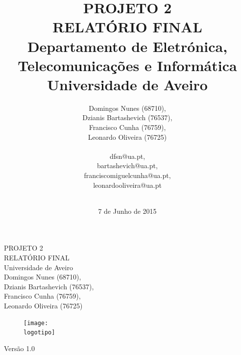 \documentclass{report}
\begin{document}
%
\def\titulo{PROJETO 2\\RELATÓRIO FINAL}
\def\data{7 de Junho de 2015}
\def\autores{Domingos Nunes (68710),\\ Dzianis Bartashevich (76537),\\ Francisco Cunha (76759),\\ Leonardo Oliveira (76725)}
\def\autorescontactos{dfsn@ua.pt,\\ bartashevich@ua.pt,\\ franciscomiguelcunha@ua.pt,\\ leonardooliveira@ua.pt}
\def\versao{Versão 1.0}
\def\departamento{Departamento de Eletrónica,\\ Telecomunicações e Informática}
\def\empresa{Universidade de Aveiro}
\def\logotipo{images/ua.pdf}
%
%
\begin{titlepage}

\begin{center}
%
\vspace*{50mm}
%
{\Huge \titulo}\\ 
%
\vspace{10mm}
%
{\Large \empresa}\\
%
\vspace{10mm}
%
{\LARGE \autores}\\ 
%
%
\vspace{20mm}
%
\begin{figure}[h]
\center
\texttt{[image: \\logotipo]}
\end{figure}
%
\vspace{10mm}
\end{center}
%
\begin{flushright}
\versao
\end{flushright}
\end{titlepage}

%
%
%
%
\title{%
{\Huge\textbf{\titulo}}\\
{\Large \departamento\\ \empresa}
}
%
\author{%
    \autores \\
    \\
    \autorescontactos
    \\
    \\
}
%
\date{\data}
%
\maketitle
%
%
\end{document}
